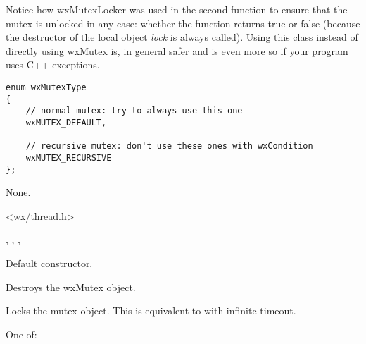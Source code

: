 Notice how wxMutexLocker was used in the second function to ensure that the
mutex is unlocked in any case: whether the function returns true or false
(because the destructor of the local object {\it lock} is always called). Using
this class instead of directly using wxMutex is, in general safer and is even
more so if your program uses C++ exceptions.


\begin{verbatim}
enum wxMutexType
{
    // normal mutex: try to always use this one
    wxMUTEX_DEFAULT,

    // recursive mutex: don't use these ones with wxCondition
    wxMUTEX_RECURSIVE
};
\end{verbatim}


None.


<wx/thread.h>




, , 
, 



\label{wxmutexctor}


Default constructor.


\label{wxmutexdtor}


Destroys the wxMutex object.


\label{wxmutexlock}


Locks the mutex object. This is equivalent to 
 with infinite timeout.


One of:

\twocolwidtha{7cm}
\begin{twocollist}\itemsep=0pt
\end{twocollist}


